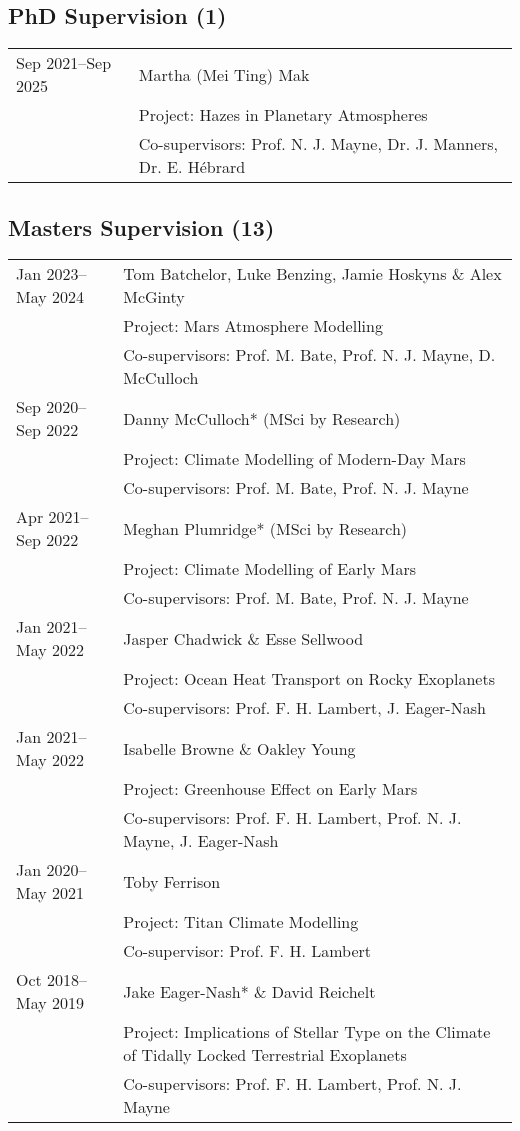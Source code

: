 \documentclass[a4paper, 11pt]{article}
\begin{document}
\subsection*{PhD Supervision (1)}
\begin{tabularx}{\linewidth}{@{}l X@{}}
Sep 2021--Sep 2025 & Martha (Mei Ting) Mak \\
                  & Project: Hazes in Planetary Atmospheres \\
                  & Co-supervisors: Prof. N. J. Mayne, Dr. J. Manners, Dr. E. Hébrard \\
\end{tabularx}

\subsection*{Masters Supervision (13)}
\begin{tabularx}{\linewidth}{@{}l X@{}}
Jan 2023--May 2024 & Tom Batchelor, Luke Benzing, Jamie Hoskyns \& Alex McGinty \\
                  & Project: Mars Atmosphere Modelling \\
                  & Co-supervisors: Prof. M. Bate, Prof. N. J. Mayne, D. McCulloch \\
Sep 2020--Sep 2022 & Danny McCulloch* (MSci by Research) \\
                  & Project: Climate Modelling of Modern-Day Mars \\
                  & Co-supervisors: Prof. M. Bate, Prof. N. J. Mayne \\
Apr 2021--Sep 2022 & Meghan Plumridge* (MSci by Research) \\
                  & Project: Climate Modelling of Early Mars \\
                  & Co-supervisors: Prof. M. Bate, Prof. N. J. Mayne \\
Jan 2021--May 2022 & Jasper Chadwick \& Esse Sellwood \\
                  & Project: Ocean Heat Transport on Rocky Exoplanets \\
                  & Co-supervisors: Prof. F. H. Lambert, J. Eager-Nash \\
Jan 2021--May 2022 & Isabelle Browne \& Oakley Young \\
                  & Project: Greenhouse Effect on Early Mars \\
                  & Co-supervisors: Prof. F. H. Lambert, Prof. N. J. Mayne, J. Eager-Nash \\
Jan 2020--May 2021 & Toby Ferrison \\
                  & Project: Titan Climate Modelling \\
                  & Co-supervisor: Prof. F. H. Lambert \\
Oct 2018--May 2019 & Jake Eager-Nash* \& David Reichelt \\
                  & Project: Implications of Stellar Type on the Climate of Tidally Locked Terrestrial Exoplanets \\
                  & Co-supervisors: Prof. F. H. Lambert, Prof. N. J. Mayne \\
\end{tabularx}
\end{document}
